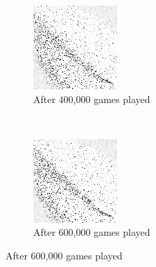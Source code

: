 \begin{figure}
	\begin{subfigure}[b]{0.4\textwidth}
	\includegraphics[width=\linewidth]{images/findings/round1/flipbook_c.png}
	\caption{After 400,000 games played}
	\end{subfigure}
	~
	\begin{subfigure}[b]{0.4\textwidth}
	\includegraphics[width=\linewidth]{images/findings/round1/flipbook_d.png}
	\caption{After 600,000 games played}
	\end{subfigure}


\end{figure}
